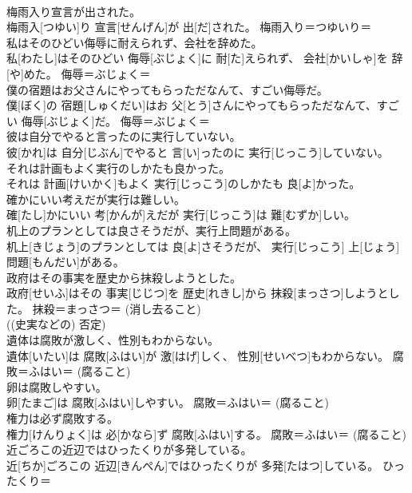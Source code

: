 \documentclass[8pt]{extreport}
\begin{document}
\begin{CJK}{UTF8}{min}
{\\	梅雨入り宣言が出された。	
\\	梅雨入[つゆい]り 宣言[せんげん]が 出[だ]された。	梅雨入り＝つゆいり＝ 
\\	私はそのひどい侮辱に耐えられず、会社を辞めた。	
\\	私[わたし]はそのひどい 侮辱[ぶじょく]に 耐[た]えられず、 会社[かいしゃ]を 辞[や]めた。	侮辱＝ぶじょく＝ 
\\	僕の宿題はお父さんにやってもらっただなんて、すごい侮辱だ。	
\\	僕[ぼく]の 宿題[しゅくだい]はお 父[とう]さんにやってもらっただなんて、すごい 侮辱[ぶじょく]だ。	侮辱＝ぶじょく＝ 
\\	彼は自分でやると言ったのに実行していない。	
\\	彼[かれ]は 自分[じぶん]でやると 言[い]ったのに 実行[じっこう]していない。	
\\	それは計画もよく実行のしかたも良かった。	
\\	それは 計画[けいかく]もよく 実行[じっこう]のしかたも 良[よ]かった。	
\\	確かにいい考えだが実行は難しい。	
\\	確[たし]かにいい 考[かんが]えだが 実行[じっこう]は 難[むずか]しい。	
\\	机上のプランとしては良さそうだが、実行上問題がある。	
\\	机上[きじょう]のプランとしては 良[よ]さそうだが、 実行[じっこう] 上[じょう] 問題[もんだい]がある。	
\\	政府はその事実を歴史から抹殺しようとした。	
\\	政府[せいふ]はその 事実[じじつ]を 歴史[れきし]から 抹殺[まっさつ]しようとした。	抹殺＝まっさつ＝ (消し去ること) 
\\	((史実などの) 否定) 
\\	遺体は腐敗が激しく、性別もわからない。	
\\	遺体[いたい]は 腐敗[ふはい]が 激[はげ]しく、 性別[せいべつ]もわからない。	腐敗＝ふはい＝ (腐ること) 
\\	卵は腐敗しやすい。	
\\	卵[たまご]は 腐敗[ふはい]しやすい。	腐敗＝ふはい＝ (腐ること) 
\\	権力は必ず腐敗する。	
\\	権力[けんりょく]は 必[かなら]ず 腐敗[ふはい]する。	腐敗＝ふはい＝ (腐ること) 
\\	近ごろこの近辺ではひったくりが多発している。	
\\	近[ちか]ごろこの 近辺[きんぺん]ではひったくりが 多発[たはつ]している。	ひったくり＝ 
}
\end{CJK}
\end{document}
